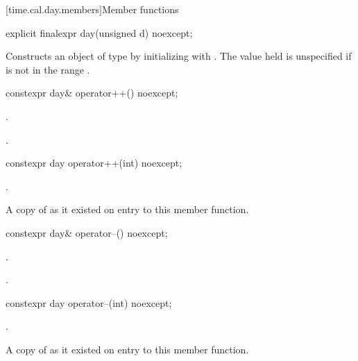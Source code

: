 [time.cal.day.members]{Member functions}

%
\begin{itemdecl}
explicit finalexpr day(unsigned d) noexcept;
\end{itemdecl}

\begin{itemdescr}
\pnum
\effects
Constructs an object of type  by
initializing  with .
The value held is unspecified if  is not in the range .
\end{itemdescr}

%
\begin{itemdecl}
constexpr day& operator++() noexcept;
\end{itemdecl}

\begin{itemdescr}
\pnum
\effects {}.

\pnum
\returns {}.
\end{itemdescr}

%
\begin{itemdecl}
constexpr day operator++(int) noexcept;
\end{itemdecl}

\begin{itemdescr}
\pnum
\effects {}.

\pnum
\returns A copy of  as it existed on entry to this member function.
\end{itemdescr}

%
\begin{itemdecl}
constexpr day& operator--() noexcept;
\end{itemdecl}

\begin{itemdescr}
\pnum
\effects {}.

\pnum
\returns {}.
\end{itemdescr}

%
\begin{itemdecl}
constexpr day operator--(int) noexcept;
\end{itemdecl}

\begin{itemdescr}
\pnum
\effects {}.

\pnum
\returns A copy of  as it existed on entry to this member function.
\end{itemdescr}

